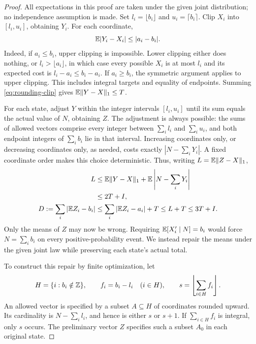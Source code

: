 \begin{proof}
All expectations in this proof are taken under the given joint distribution;
no independence assumption is made.  Set $l_i=\lfloor b_i\rfloor$ and
$u_i=\lceil b_i\rceil$.  Clip $X_i$ into $[l_i,u_i]$, obtaining $Y_i$.
For each coordinate,
\begin{equation}\label{eq:rounding-clip}
                       \mathbb E|Y_i-X_i|\le |a_i-b_i|.
\end{equation}
Indeed, if $a_i\le b_i$, upper clipping is impossible.  Lower clipping either
does nothing, or $l_i>\lfloor a_i\rfloor$, in which case every possible $X_i$
is at most $l_i$ and its expected cost is $l_i-a_i\le b_i-a_i$.
If $a_i\ge b_i$, the symmetric argument applies to upper clipping.
This includes integral targets and equality of endpoints.  Summing
\eqref{eq:rounding-clip} gives $\mathbb E\|Y-X\|_1\le T$.

For each state, adjust $Y$ within the integer intervals $[l_i,u_i]$ until its
sum equals the actual value of $N$, obtaining $Z$.  The adjustment is always
possible: the sums of allowed vectors comprise every integer between
$\sum_i l_i$ and $\sum_i u_i$, and both endpoint integers of $\sum_i b_i$
lie in that interval.  Increasing coordinates only, or decreasing coordinates
only, as needed, costs exactly $|N-\sum_iY_i|$.  A fixed coordinate order
makes this choice deterministic.  Thus, writing $L=\mathbb E\|Z-X\|_1$,
\begin{equation}\label{eq:rounding-preliminary}
 \begin{aligned}
 L&\le \mathbb E\|Y-X\|_1+\mathbb E\left|N-\sum_iY_i\right|\\
  &\le 2T+I,\\
 D:=\sum_i|\mathbb E Z_i-b_i|
  &\le \sum_i|\mathbb E Z_i-a_i|+T
   \le L+T\le3T+I.
 \end{aligned}
\end{equation}
Only the means of $Z$ may now be wrong.  Requiring
$\mathbb E[X'_i\mid N]=b_i$ would force $N=\sum_i b_i$ on every
positive-probability event.  We instead repair the means under the given
joint law while preserving each state's actual total.

To construct this repair by finite optimization, let
\[
 H=\{i:b_i\notin\mathbb Z\},\qquad f_i=b_i-l_i\quad(i\in H),
 \qquad s=\left\lfloor\sum_{i\in H}f_i\right\rfloor.
\]
An allowed vector is specified by a subset $A\subseteq H$ of coordinates
rounded upward.  Its cardinality is $N-\sum_i l_i$, and hence is either $s$
or $s+1$.  If $\sum_{i\in H}f_i$ is integral, only $s$ occurs.  The preliminary
vector $Z$ specifies such a subset $A_0$ in each original state.


\end{proof}
